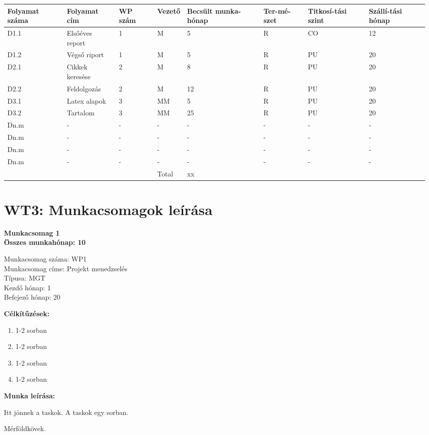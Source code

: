 \Large
\begin{tabular}{|p{}|p{}|p{}|p{}|p{}|p{}|p{}|p{}|}
\hline
\textbf{Folyamat száma}  & \textbf{Folyamat cím} & \textbf{WP szám} & \textbf{Vezető} & \textbf{Becsült munka-hónap} & \textbf{Ter-mé-szet} & \textbf{Titkosí-tási szint} & \textbf{Szállí-tási hónap} \\[3ex]
\hline
D1.1 & Elsőéves report & 1 & M & 5 & R & CO & 12 \\ [3ex]
\hline
D1.2 & Végső riport & 1 & M & 5 & R & PU & 20 \\ [3ex]
\hline
D2.1 & Cikkek keresése & 2 & M & 8 & R & PU & 20 \\ [3ex]
\hline
D2.2 & Feldolgozás & 2 & M & 12 & R & PU & 20 \\ [3ex]
\hline
D3.1 & Latex alapok & 3 & MM & 5 & R & PU & 20 \\ [3ex]
\hline
D3.2 & Tartalom & 3 & MM & 25 & R & PU & 20 \\ [3ex]
\hline
Dn.m & - & - & - & - & - & - & - \\ [3ex]
\hline
Dn.m & - & - & - & - & - & - & - \\ [3ex]
\hline
Dn.m & - & - & - & - & - & - & - \\ [3ex]
\hline
Dn.m & - & - & - & - & - & - & - \\ [3ex]
\hline
\multicolumn{3}{c|}{}& Total & xx & \multicolumn{2}{|c}{} \\ [3ex]
\cline{4-5}
\end{tabular}
\normalsize

\newpage
\section*{WT3: Munkacsomagok leírása}


\Large{\textbf{Munkacsomag 1}}
\bigskip\\
\large{\textbf{Összes munkahónap: 10}}
\bigskip 



Munkacsomag száma: WP1 \\
Munkacsomag címe: Projekt menedzselés \\
Típusa: MGT \\
Kezdő hónap: 1 \\
Befejező hónap: 20 \\
\medskip

\textbf{Célkítűzések:}
\medskip

\begin{enumerate}
    \item 1-2 sorban
    \item 1-2 sorban
    \item 1-2 sorban
    \item 1-2 sorban
\end{enumerate}


\textbf{Munka leírása:}
\medskip

Itt jönnek a taskok. 
A taskok egy sorban.

\medskip
Mérföldkövek.




